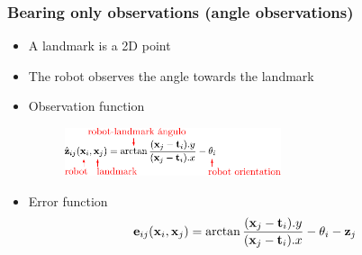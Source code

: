     \begin{frame}
     \frametitle{Bearing only observations (angle observations)}
    
    
    
     \begin{itemize}
     \item A landmark is a 2D point
     \item The robot observes the angle towards the landmark
     \item Observation function
     \begin{figure}[!h]
     \includegraphics[width=0.6\textwidth]{images/pose_landmark_graph_bearing_observation.pdf}
     \end{figure}
     \item Error function
     \begin{equation*}
     \boldsymbol{\mathbf{e}} _{ij}(\boldsymbol{\mathbf{x}} _{i},\boldsymbol{\mathbf{x}} _{j}) = \arctan{\dfrac{(\boldsymbol{\mathbf{x}}_{j}-\boldsymbol{\mathbf{t}}_{i}).y}{(\boldsymbol{\mathbf{x}}_{j}-\boldsymbol{\mathbf{t}}_{i}).x}} - \theta _{i} - \boldsymbol{\mathbf{z}} _{j}
     \end{equation*}
     \end{itemize}
    
    
\end{frame}

